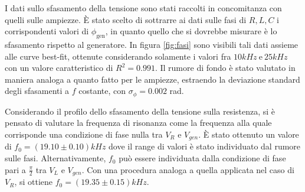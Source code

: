 I dati sullo sfasamento della tensione sono stati raccolti in concomitanza con quelli sulle ampiezze. È stato scelto di
sottrarre ai dati sulle fasi di $R, L , C$ i corrispondenti valori di $\phi_{\text{gen}}$, in quanto quello che
si dovrebbe misurare è lo sfasamento rispetto al generatore.
In figura \ref{fig:fasi} sono visibili tali dati assieme alle curve best-fit, ottenute considerando solamente i valori
fra $10 kHz  \ \text{e} \ 25 kHz$ con un valore caratteristico di $R^2 = 0.991$. Il rumore di fondo è stato valutato in
maniera analoga a quanto fatto per le ampiezze, estraendo la deviazione standard degli sfasamenti a $f$ costante, con
$\sigma_{\phi} = 0.002$ rad.


Considerando il profilo dello sfasamento della tensione sulla resistenza, si è pensato di valutare la frequenza di risonanza
come la frequenza alla quale corrisponde una condizione di fase nulla tra $V_R$ e $V_{gen}$.
È stato ottenuto un valore di $f_0 = (19.10 \pm 0.10)kHz$ dove il range di valori è stato individuato dal rumore sulle fasi.
Alternativamente, $f_0$ può essere individuata dalla condizione di fase pari a $\frac{\pi}{2}$ tra $V_L$ e $V_{gen}$.
Con una procedura analoga a quella applicata nel caso di $V_R$, si ottiene $f_0 = (19.35 \pm 0.15)kHz$.






















